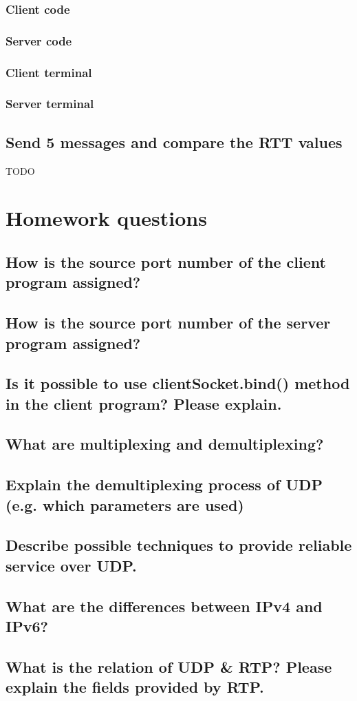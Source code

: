 \documentclass[a4paper,12pt]{article}
\begin{document}
\subsubsection{Client code}

\subsubsection{Server code}

\subsubsection{Client terminal}

\subsubsection{Server terminal}

\subsection{Send 5 messages and compare the RTT values}

TODO

\section{Homework questions}

\subsection{How is the source port number of the client program assigned?}
\subsection{How is the source port number of the server program assigned?}
\subsection{Is it possible to use clientSocket.bind() method in the client program? Please explain.}
\subsection{What are multiplexing and demultiplexing?}
\subsection{Explain the demultiplexing process of UDP (e.g. which parameters are used)}
\subsection{Describe possible techniques to provide reliable service over UDP.}
\subsection{What are the differences between IPv4 and IPv6?}
\subsection{What is the relation of UDP \& RTP? Please explain the fields provided by RTP.}
\end{document}
